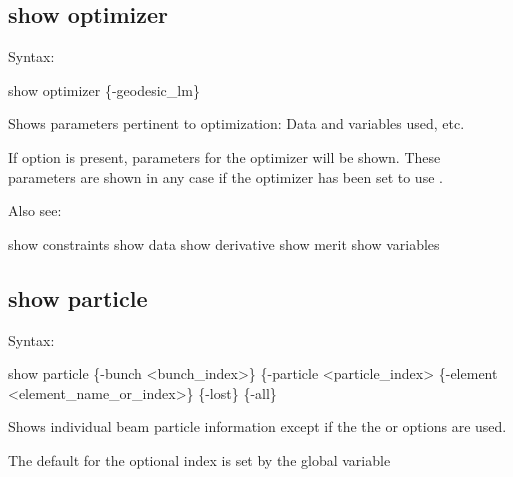 {{{{{{{{%

\subsection{show optimizer}
\label{s:show.optimizer}

Syntax:
\begin{example}
  show optimizer \{-geodesic_lm\}
\end{example}


Shows parameters pertinent to optimization: Data and variables used,
etc. 

If  option is present, parameters for the  optimizer will
be shown. These parameters are shown in any case if the optimizer has been set to use
.

Also see:
\begin{example}
  show constraints
  show data
  show derivative
  show merit
  show variables
\end{example}


\subsection{show particle}
\label{s:show.particle}

Syntax:
\begin{example}
    show particle \{-bunch <bunch_index>\} \{-particle <particle_index>
                  \{-element <element_name_or_index>\} \{-lost\} \{-all\}
\end{example}


Shows individual beam particle information except if the the  or  options are used. 

The default for the optional  index is set by the global variable \vn{global%
The default \vn{-element} is \vn{init} which is the initial beam distribution.
The default \vn{-particle} to show is the particle with index 1.

The \vn{-lost} option shows which particles are lost during beam tracking. Note: Using the
\vn{-lost} option results in one line printed for each lost particle. It is thus meant for use with
bunches with a small number of particles.

The \vn{-all} option shows all particles at the given element.

}}}}}}}}}
